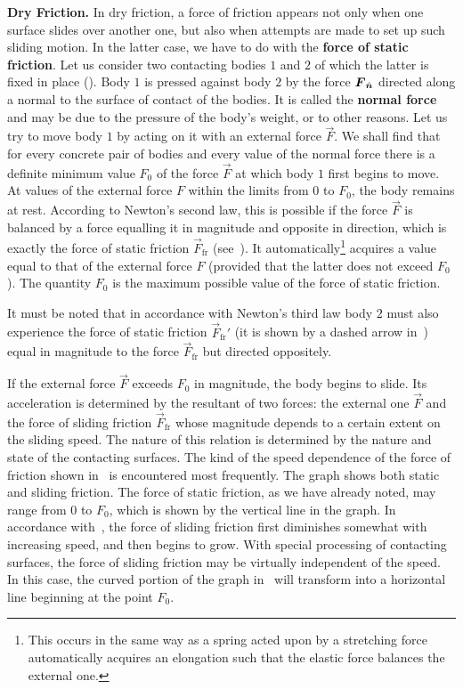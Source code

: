 \textbf{Dry Friction.} In dry friction, a force of friction appears not only when one surface slides over another one, but also when attempts are made to set up such sliding motion. In the latter case, we have to do with the \textbf{force of static friction}. Let us consider two contacting bodies $1$ and $2$ of which the latter is fixed in place (). Body $1$ is pressed against body $2$ by the force $\boldsymbol{F}_{\hat{\boldsymbol{n}}}$ directed along a normal to the surface of contact of the bodies. It is called the \textbf{normal force} and may be due to the pressure of the body's weight, or to other reasons. Let us try to move body $1$ by acting on it with an external force $\vec{F}$. We shall find that for every concrete pair of bodies and every value of the normal force there is a definite minimum value $F_0$ of the force $\vec{F}$ at which body $1$ first begins to move. At values of the external force $F$ within the limits from $0$ to $F_0$, the body remains at rest. According to Newton's second law, this is possible if the force $\vec{F}$ is balanced by a force equalling it in magnitude and opposite in direction, which is exactly the force of static friction $\vec{F}_{\text{fr}}$ (see~). It automatically\footnote{This occurs in the same way as a spring acted upon by a stretching force automatically acquires an elongation such that the elastic force balances the external one.} acquires a value equal to that of the external force $F$ (provided that the latter does not exceed $F_0$). The quantity $F_0$ is the maximum possible value of the force of static friction.

It must be noted that in accordance with Newton's third law body $2$ must also experience the force of static friction $\vec{F}_{\text{fr}}'$ (it is shown by a dashed arrow in~) equal in magnitude to the force $\vec{F}_{\text{fr}}$ but directed oppositely.

If the external force $\vec{F}$ exceeds $F_0$ in magnitude, the body begins to slide. Its acceleration is determined by the resultant of two forces: the external one $\vec{F}$ and the force of sliding friction $\vec{F}_{\text{fr}}$ whose magnitude depends to a certain extent on the sliding speed. The nature of this relation is determined by the nature and state of the contacting surfaces. The kind of the speed dependence of the force of friction shown in~ is encountered most frequently. The graph shows both static and sliding friction. The force of static friction, as we have already noted, may range from $0$ to $F_0$, which is shown by the vertical line in the graph. In accordance with~, the force of sliding friction first diminishes somewhat with increasing speed, and then begins to grow. With special processing of contacting surfaces, the force of sliding friction may be virtually independent of the speed. In this case, the curved portion of the graph in~ will transform into a horizontal line beginning at the point $F_0$.

